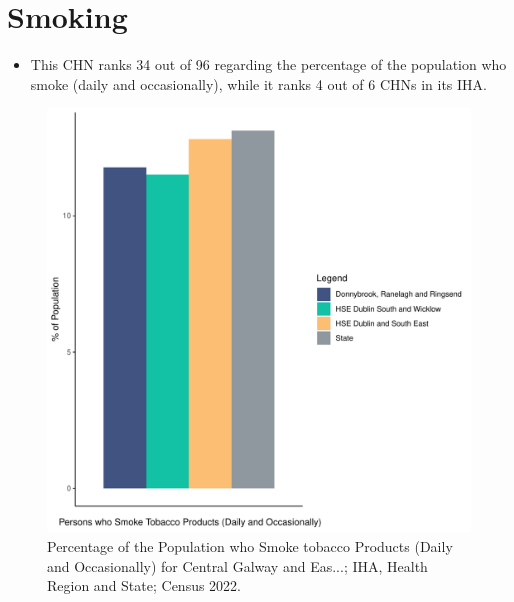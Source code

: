 \documentclass{article}
\begin{document}
\pagebreak

\section{Smoking}\label{sect:Smoking}
\begin{itemize}
\item This CHN ranks  34 out of 96 regarding the percentage of the population who smoke (daily and occasionally), while it ranks   4 out of 6 CHNs in its IHA.
\end{itemize}
\begin{figure}[H]
	\centering
	\includegraphics[width = 120mm]{../figures/SmokingED.pdf}
	\caption{Percentage of the Population who Smoke tobacco Products (Daily and Occasionally) for Central Galway and Eas...; IHA, Health Region and State; Census 2022.}
	\label{fig:2ae19629-1a6a-13a3-e055-000000000001}
	\end{figure}
	
\end{document}
